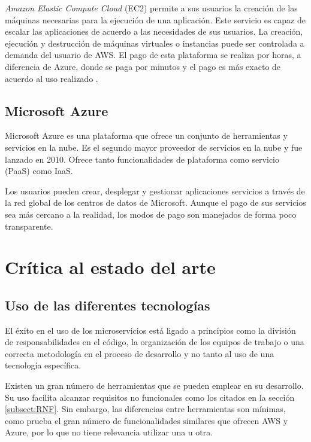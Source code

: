 \documentclass[11pt,spanish,listoffigures]{tfgetsinf}
\begin{document}
\textit{Amazon Elastic Compute Cloud} (EC2) permite a sus usuarios la creación de las máquinas necesarias para la ejecución de una aplicación. Este servicio es capaz de escalar las aplicaciones de acuerdo a las necesidades de sus usuarios. La creación, ejecución y destrucción de máquinas virtuales o instancias puede ser controlada a demanda del usuario de AWS. El pago de esta plataforma se realiza por horas, a diferencia de Azure, donde se paga por minutos y el pago es más exacto de acuerdo al uso realizado \cite{Qaisi2016}.

\subsection{Microsoft Azure}

Microsoft Azure \cite{Qaisi2016} es una plataforma que ofrece un conjunto de herramientas y servicios en la nube. Es el segundo mayor proveedor de servicios en la nube y fue lanzado en 2010. Ofrece tanto funcionalidades de plataforma como servicio (PaaS) como IaaS.

Los usuarios pueden crear, desplegar y gestionar aplicaciones  servicios a través de la red global de los centros de datos de Microsoft. Aunque el pago de sus servicios sea más cercano a la realidad, los modos de pago son manejados de forma poco transparente.

\newpage

\section{Crítica al estado del arte}

\subsection{Uso de las diferentes tecnologías}

El éxito en el uso de los microservicios está ligado a principios como la división de responsabilidades en el código, la organización de los equipos de trabajo o una correcta metodología en el proceso de desarrollo y no tanto al uso de una tecnología específica. 

Existen un gran número de herramientas que se pueden emplear en su desarrollo. Su uso facilita alcanzar requisitos no funcionales como los citados en la sección \ref{subsect:RNF}. Sin embargo, las diferencias entre herramientas son mínimas, como prueba el gran número de funcionalidades similares que ofrecen AWS y Azure, por lo que no tiene relevancia utilizar una u otra. 
\end{document}
